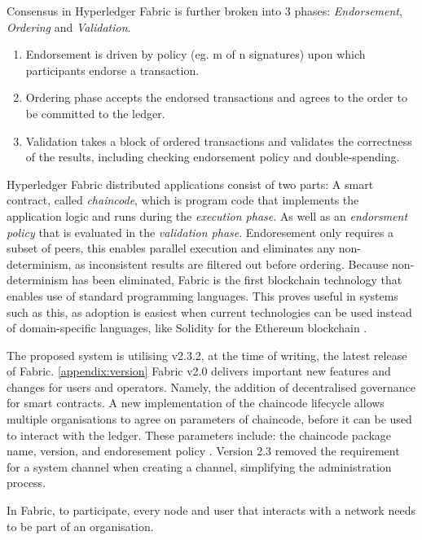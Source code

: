 Consensus in Hyperledger Fabric is further broken into 3 phases: \emph{Endorsement}, \emph{Ordering} and \emph{Validation}.
\begin{enumerate}
  \item Endorsement is driven by policy (eg. m of n signatures) upon which participants endorse a transaction. 
  \item Ordering phase accepts the endorsed transactions and agrees to the order to be committed to the ledger.
  \item Validation takes a block of ordered transactions and validates the correctness of the results, including checking endorsement policy and double-spending.
\end{enumerate}

Hyperledger Fabric distributed applications consist of two parts: A smart contract, called \emph{chaincode}, which is program code that implements the application logic and runs during the \emph{execution phase}.
As well as an \emph{endorsment policy} that is evaluated in the \emph{validation phase}.
Endoresement only requires a subset of peers, this enables parallel execution and eliminates any non-determinism, as inconsistent results are filtered out before ordering.
Because non-determinism has been eliminated, Fabric is the first blockchain technology that enables use of standard programming languages. \cite{androulaki_hyperledger_2018}
This proves useful in systems such as this, as adoption is easiest when current technologies can be used instead of domain-specific languages, like Solidity for the Ethereum blockchain \cite{noauthor_ethereum_nodate}.

The proposed system is utilising v2.3.2, at the time of writing, the latest release of Fabric. \ref{appendix:version}
Fabric v2.0 delivers important new features and changes for users and operators. %
Namely, the addition of decentralised governance for smart contracts. 
A new implementation of the chaincode lifecycle allows multiple organisations to agree on parameters of chaincode, before it can be used to interact with the ledger. 
These parameters include: the chaincode package name, version, and endoresement policy \cite{noauthor_whats_nodate}.
Version 2.3 removed the requirement for a system channel when creating a channel, simplifying the administration process. \cite{noauthor_create_nodate}

In Fabric, to participate, every node and user that interacts with a network needs to be part of an organisation. \cite{noauthor_using_nodate}

